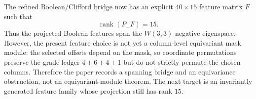 
\makeatletter
{}
\makeatother
\providecommand{\PSp}{\mathrm{PSp}}
\providecommand{\Aut}{\mathrm{Aut}}
\providecommand{\spec}{\operatorname{spec}}


\begin{remark}
\label{rem:boolean-bridge-obstruction}
The refined Boolean/Clifford bridge now has an explicit $40\times15$ feature
matrix $F$ such that
\[
  \operatorname{rank}(P_-F)=15.
\]
Thus the projected Boolean features span the $W(3,3)$ negative eigenspace.
However, the present feature choice is not yet a column-level equivariant mask
module: the selected offsets depend on the mask, so coordinate permutations
preserve the grade ledger $4+6+4+1$ but do not strictly permute the chosen
columns.  Therefore the paper records a spanning bridge and an equivariance
obstruction, not an equivariant-module theorem.  The next target is an invariantly
generated feature family whose projection still has rank $15$.
\end{remark}
